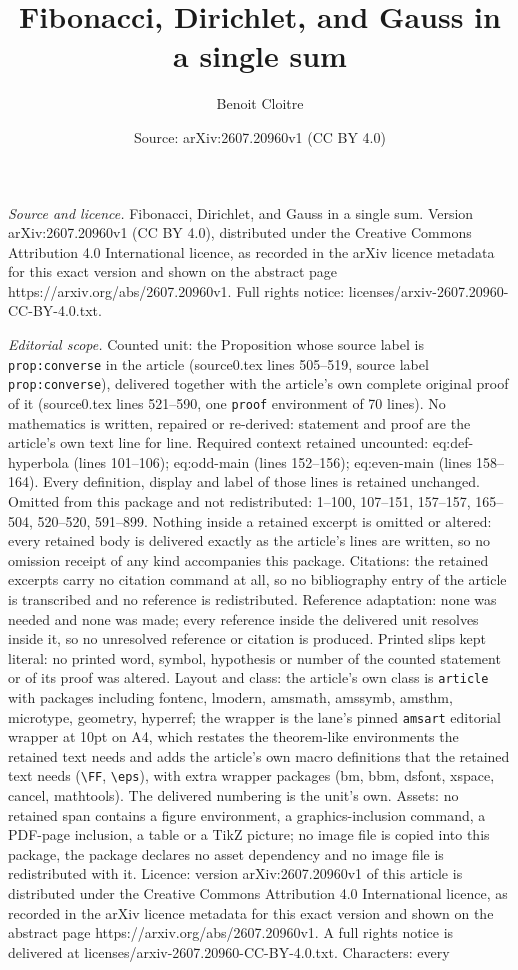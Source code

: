 \documentclass[10pt,a4paper]{amsart}
\title[Fibonacci, Dirichlet, and Gauss in a single sum]{Fibonacci, Dirichlet, and Gauss in a single sum}
\author{Benoit Cloitre}
\date{Source: arXiv:2607.20960v1 (CC BY 4.0)}
\begin{document}
\maketitle

\noindent\emph{Source and licence.} Fibonacci, Dirichlet, and Gauss in a single sum. Version arXiv:2607.20960v1 (CC BY 4.0), distributed under the Creative Commons Attribution 4.0 International licence, as recorded in the arXiv licence metadata for this exact version and shown on the abstract page https://arxiv.org/abs/2607.20960v1. Full rights notice: licenses/arxiv-2607.20960-CC-BY-4.0.txt.\par\smallskip

\noindent\textit{Editorial scope.} Counted unit: the Proposition whose source label is \texttt{prop:converse} in the article (source0.tex lines 505--519, source label \texttt{prop:converse}), delivered together with the article's own complete original proof of it (source0.tex lines 521--590, one \texttt{proof} environment of 70 lines). No mathematics is written, repaired or re-derived: statement and proof are the article's own text line for line. Required context retained uncounted: eq:def-hyperbola (lines 101--106); eq:odd-main (lines 152--156); eq:even-main (lines 158--164). Every definition, display and label of those lines is retained unchanged. Omitted from this package and not redistributed: 1--100, 107--151, 157--157, 165--504, 520--520, 591--899. Nothing inside a retained excerpt is omitted or altered: every retained body is delivered exactly as the article's lines are written, so no omission receipt of any kind accompanies this package. Citations: the retained excerpts carry no citation command at all, so no bibliography entry of the article is transcribed and no reference is redistributed. Reference adaptation: none was needed and none was made; every reference inside the delivered unit resolves inside it, so no unresolved reference or citation is produced. Printed slips kept literal: no printed word, symbol, hypothesis or number of the counted statement or of its proof was altered. Layout and class: the article's own class is \texttt{article} with packages including fontenc, lmodern, amsmath, amssymb, amsthm, microtype, geometry, hyperref; the wrapper is the lane's pinned \texttt{amsart} editorial wrapper at 10pt on A4, which restates the theorem-like environments the retained text needs and adds the article's own macro definitions that the retained text needs (\texttt{\textbackslash FF}, \texttt{\textbackslash eps}), with extra wrapper packages (bm, bbm, dsfont, xspace, cancel, mathtools). The delivered numbering is the unit's own. Assets: no retained span contains a figure environment, a graphics-inclusion command, a PDF-page inclusion, a table or a TikZ picture; no image file is copied into this package, the package declares no asset dependency and no image file is redistributed with it. Licence: version arXiv:2607.20960v1 of this article is distributed under the Creative Commons Attribution 4.0 International licence, as recorded in the arXiv licence metadata for this exact version and shown on the abstract page https://arxiv.org/abs/2607.20960v1. A full rights notice is delivered at licenses/arxiv-2607.20960-CC-BY-4.0.txt. Characters: every 
\end{document}
